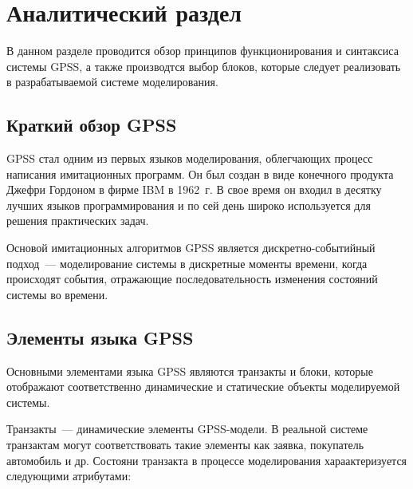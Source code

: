 \chapter{Аналитический раздел}
\label{cha:analysis}

В данном разделе проводится обзор принципов функционирования и синтаксиса системы GPSS, а также производтся выбор блоков, которые следует реализовать в разрабатываемой системе моделирования.

\section{Краткий обзор GPSS}

GPSS стал одним из первых языков моделирования, облегчающих процесс написания имитационных программ. Он был создан в виде конечного продукта Джефри Гордоном в фирме IBM в 1962~г.\cite{ImitGPSS} В свое время он входил в десятку лучших языков программирования и по сей день широко используется для решения практических задач.

Основой имитационных алгоритмов GPSS является дискретно-событийный подход~--- моделирование сис­темы в дискретные моменты времени, когда происходят события, от­ражающие последовательность изменения состояний системы во времени.\cite{ImitGPSS}

\section{Элементы языка GPSS}

Основными элементами языка GPSS являются транзакты и блоки, которые отображают соответственно динамические и статические объекты моделируемой системы.

Транзакты~--- динамические элементы GPSS-модели. В реальной системе транзактам могут соответствовать такие элементы как заявка, покупатель автомобиль и др. Состояни транзакта в процессе моделирования хараактеризуется следующими атрибутами:

